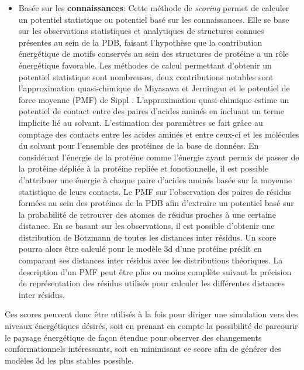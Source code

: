 \begin{itemize}
	\item Basée sur les \textbf{connaissances}: Cette méthode de \textit{scoring} permet de calculer un potentiel statistique ou potentiel basé sur les connaissances. Elle se base sur les observations statistiques et analytiques de structures connues présentes au sein de la PDB, faisant l'hypothèse que la contribution énergétique de motifs conservés au sein des structures de protéine a un rôle énergétique favorable. Les méthodes de calcul permettant d'obtenir un potentiel statistique sont nombreuses, deux contributions notables sont l'approximation quasi-chimique de Miyasawa et Jerningan \cite{miyazawa1985estimation} et le potentiel de force moyenne (PMF) de Sippl \cite{sippl1990calculation}. L'approximation quasi-chimique estime un potentiel de contact entre des paires d'acides aminés en incluant un terme implicite lié au solvant. L'estimation des paramètres se fait grâce au comptage des contacts entre les acides aminés et entre ceux-ci et les molécules du solvant pour l'ensemble des protéines de la base de données. En considérant l'énergie de la protéine comme l'énergie ayant permis de passer de la protéine dépliée à la protéine repliée et fonctionnelle, il est possible d'attribuer une énergie à chaque paire d'acides aminés basée sur la moyenne statistique de leurs contacts. Le PMF sur l'observation des paires de résidus formées au sein des protéines de la PDB afin d'extraire un potentiel basé sur la probabilité de retrouver des atomes de résidus proches à une certaine distance. En se basant sur les observations, il est possible d'obtenir une distribution de Botzmann de toutes les distances inter résidus. Un score pourra alors être calculé pour le modèle 3d d'une protéine prédit en comparant ses distances inter résidus avec les distributions théoriques. La description d'un PMF peut être plus ou moins complète suivant la précision de représentation des résidus utilisés pour calculer les différentes distances inter résidus.
\end{itemize}

Ces scores peuvent donc être utilisés à la fois pour diriger une simulation vers des niveaux énergétiques désirés, soit en prenant en compte la possibilité de parcourir le paysage énergétique de façon étendue pour observer des changements conformationnels intéressants, soit en minimisant ce score afin de générer des modèles 3d les plus stables possible.

